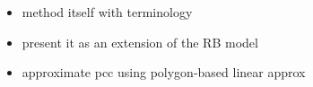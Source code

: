 \begin{itemize}
    \item method itself with terminology
    \item present it as an extension of the RB model
    \item approximate pcc using polygon-based linear approx 
\end{itemize}